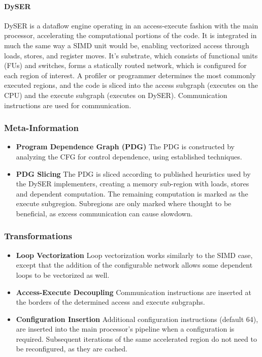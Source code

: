 \paragraph{DySER}
DySER is a dataflow engine operating in an access-execute fashion with the 
main processor, accelerating the computational portions of the code.  
It is integrated in much the same way a SIMD unit would be, enabling vectorized access
through loads, stores, and register moves.  It's substrate, which
consists of functional units (FUs) and switches, forms a statically 
routed network, which is configured for each region of interest. A profiler 
or programmer determines the most commonly executed regions, and the 
code is sliced into the access subgraph (executes on the CPU) and the 
execute subgraph (executes on DySER).  Communication instructions are 
used for communication.

\subsubsection*{Meta-Information}
\begin{itemize}
  \item \textbf{Program Dependence Graph (PDG)}
  The PDG is constructed by analyzing the CFG for control dependence,
  using established techniques.
  \item \textbf{PDG Slicing}
  The PDG is sliced according to published heuristics used by the DySER
  implementers, creating a memory sub-region with loads, stores and dependent
  computation.  The remaining computation is marked as the execute subgregion.
  Subregions are only marked where thought to be beneficial, as excess communication
  can cause slowdown.
\end{itemize}

\subsubsection*{Transformations}
\begin{itemize}
\item \textbf{Loop Vectorization}
Loop vectorization works similarly to the SIMD case, except that the addition
of the configurable network allows some dependent loops to be vectorized as well.
\item \textbf{Access-Execute Decoupling}
Communication instructions are inserted at the borders of the determined access 
and execute subgraphs.
\item \textbf{Configuration Insertion}
Additional configuration instructions (default 64), are inserted into the
main processor's pipeline when a configuration is required.  Subsequent iterations
of the same accelerated region do not need to be reconfigured, as they are cached.
\end{itemize}

